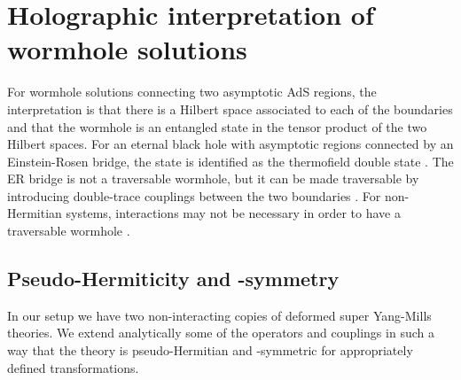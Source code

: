 \section{Holographic interpretation of wormhole solutions}\label{sec:PTsym}

For wormhole solutions connecting two asymptotic AdS regions, the interpretation is that there is a Hilbert space associated to each of the boundaries and that the wormhole is an entangled state in the tensor product of the two Hilbert spaces.
For an eternal black hole with asymptotic regions connected by an Einstein-Rosen bridge, the state is identified as the thermofield double state \cite{Maldacena:2001kr}.
The ER bridge is not a traversable wormhole, but it can be made traversable by introducing double-trace couplings between the two boundaries \cite{Gao:2016bin}.
For non-Hermitian systems, interactions may not be necessary in order to have a traversable wormhole \cite{Harper:2025lav}.  

\subsection{Pseudo-Hermiticity and \texorpdfstring{\PT}{PT}-symmetry}
%

In our setup we have two non-interacting copies of deformed super Yang-Mills theories.
We extend analytically some of the operators and couplings in such a way that the theory is pseudo-Hermitian and \PT-symmetric for appropriately defined transformations. 

